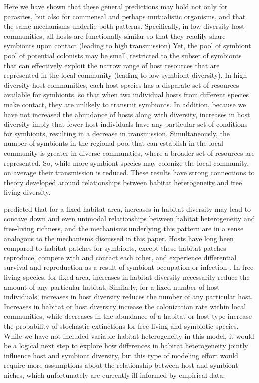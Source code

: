 \documentclass[12pt]{article}
\begin{document}
Here we have shown that these general predictions may hold not only for parasites, but also for commensal and perhaps mutualistic organisms, and that the same mechanisms underlie both patterns. 
Specifically, in low diversity host communities, all hosts are functionally similar so that they readily share symbionts upon contact (leading to high transmission)
 Yet, the pool of symbiont pool of potential colonists may be small, restricted to the subset of symbionts that can effectively exploit the narrow range of host resources that are represented in the local community (leading to low symbiont diversity). 
In high diversity host communities, each host species has a disparate set of resources available for symbionts, so that when two individual hosts from different species make contact, they are unlikely to transmit symbionts. 
In addition, because we have not increased the abundance of hosts along with diversity, increases in host diversity imply that fewer host individuals have any particular set of conditions for symbionts, resulting in a decrease in transmission. 
Simultaneously, the number of symbionts in the regional pool that can establish in the local community is greater in diverse communities, where a broader set of resources are represented. 
So, while more symbiont species may colonize the local community, on average their transmission is reduced. 
These results have strong connections to theory developed around relationships between habitat heterogeneity and free living diversity. 

\cite{Allouche2012} predicted that for a fixed habitat area, increases in habitat diversity may lead to concave down and even unimodal relationships between habitat heterogeneity and free-living richness, and the mechanisms underlying this pattern are in a sense analogous to the mechanisms discussed in this paper. 
Hosts have long been compared to habitat patches for symbionts, except these habitat patches reproduce, compete with and contact each other, and experience differential survival and reproduction as a result of symbiont occupation or infection \citep{Kuris1980, Mihaljevic2012}. 
In free living species, for fixed area, increases in habitat diversity necessarily reduce the amount of any particular habitat. 
Similarly, for a fixed number of host individuals, increases in host diversity reduces the number of any particular host. 
Increases in habitat or host diversity increase the colonization rate within local communities, while decreases in the abundance of a habitat or host type increase the probability of stochastic extinctions for free-living and symbiotic species. 
While we have not included variable habitat heterogeneity in this model, it would be a logical next step to explore how differences in habitat heterogeneity jointly influence host and symbiont diversity, but this type of modeling effort would require more assumptions about the relationship between host and symbiont niches, which unfortunately are currently ill-informed by empirical data. 
\end{document}

